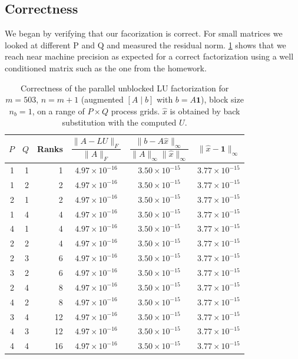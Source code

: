\documentclass[11pt]{article}
\begin{document}
\subsection{Correctness}
We began by verifying that our facorization is correct. For small matrices we looked at different P and Q and measured the residual norm.
\cref{tab:lu-correctness} shows that we reach near machine precision as expected for a correct factorization using a well conditioned matrix such as the one from the homework. 
\begin{table}[htbp]
  \centering
  \begin{tabular}{rrr ccc}
    \toprule
    $P$ & $Q$ & Ranks &
    $\dfrac{\|A - LU\|_F}{\|A\|_F}$ &
    $\dfrac{\|b - A\hat{x}\|_\infty}{\|A\|_\infty \|\hat{x}\|_\infty}$ &
    $\|\hat{x} - \mathbf{1}\|_\infty$ \\
    \midrule
    1 & 1 &  1 & $4.97\times10^{-16}$ & $3.50\times10^{-15}$ & $3.77\times10^{-15}$ \\
    1 & 2 &  2 & $4.97\times10^{-16}$ & $3.50\times10^{-15}$ & $3.77\times10^{-15}$ \\
    2 & 1 &  2 & $4.97\times10^{-16}$ & $3.50\times10^{-15}$ & $3.77\times10^{-15}$ \\
    1 & 4 &  4 & $4.97\times10^{-16}$ & $3.50\times10^{-15}$ & $3.77\times10^{-15}$ \\
    4 & 1 &  4 & $4.97\times10^{-16}$ & $3.50\times10^{-15}$ & $3.77\times10^{-15}$ \\
    2 & 2 &  4 & $4.97\times10^{-16}$ & $3.50\times10^{-15}$ & $3.77\times10^{-15}$ \\
    2 & 3 &  6 & $4.97\times10^{-16}$ & $3.50\times10^{-15}$ & $3.77\times10^{-15}$ \\
    3 & 2 &  6 & $4.97\times10^{-16}$ & $3.50\times10^{-15}$ & $3.77\times10^{-15}$ \\
    2 & 4 &  8 & $4.97\times10^{-16}$ & $3.50\times10^{-15}$ & $3.77\times10^{-15}$ \\
    4 & 2 &  8 & $4.97\times10^{-16}$ & $3.50\times10^{-15}$ & $3.77\times10^{-15}$ \\
    3 & 4 & 12 & $4.97\times10^{-16}$ & $3.50\times10^{-15}$ & $3.77\times10^{-15}$ \\
    4 & 3 & 12 & $4.97\times10^{-16}$ & $3.50\times10^{-15}$ & $3.77\times10^{-15}$ \\
    4 & 4 & 16 & $4.97\times10^{-16}$ & $3.50\times10^{-15}$ & $3.77\times10^{-15}$ \\
    \bottomrule
  \end{tabular}
  \caption{Correctness of the parallel unblocked LU factorization for
    $m = 503$, $n = m+1$ (augmented $[A \mid b]$ with $b = A\mathbf{1}$),
    block size $n_b = 1$, on a range of $P \times Q$ process grids.
    $\hat{x}$ is obtained by back substitution with the computed $U$.}
    \label{tab:lu-correctness}
\end{table}
\end{document}
